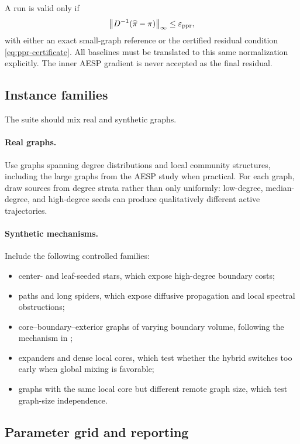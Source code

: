A run is valid only if
\begin{equation}
    \left\lVert D^{-1}(\widehat\pi-\pi)\right\rVert_\infty\leq\varepsilon_{\mathrm{ppr}},
    \label{eq:experiment-correctness}
\end{equation}
with either an exact small-graph reference or the certified residual condition
\cref{eq:ppr-certificate}.  All baselines must be translated to this same
normalization explicitly.  The inner AESP gradient is never accepted as the
final residual.

\subsection{Instance families}

The suite should mix real and synthetic graphs.

\paragraph{Real graphs.}
Use graphs spanning degree distributions and local community structures,
including the large graphs from the AESP study when practical.  For each
graph, draw sources from degree strata rather than only uniformly: low-degree,
median-degree, and high-degree seeds can produce qualitatively different
active trajectories.

\paragraph{Synthetic mechanisms.}
Include the following controlled families:
\begin{itemize}[leftmargin=2em]
\item center- and leaf-seeded stars, which expose high-degree boundary costs;
\item paths and long spiders, which expose diffusive propagation and local
      spectral obstructions;
\item core--boundary--exterior graphs of varying boundary volume, following
      the mechanism in \citet{fountoulakis2026complexity};
\item expanders and dense local cores, which test whether the hybrid switches
      too early when global mixing is favorable;
\item graphs with the same local core but different remote graph size, which
      test graph-size independence.
\end{itemize}

\subsection{Parameter grid and reporting}

